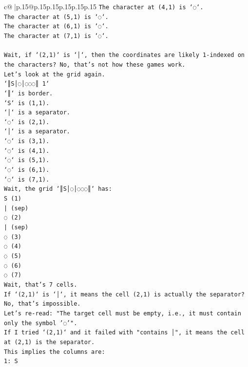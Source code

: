 \documentclass{article}
\begin{document}
{\begin{supertabular}{c@{$\;$}|p{.15\linewidth}@{}p{.15\linewidth}p{.15\linewidth}p{.15\linewidth}p{.15\linewidth}p{.15\linewidth}}
{{{\texttt{The character at (4,1) is `◌`.} \\
\texttt{The character at (5,1) is `◌`.} \\
\texttt{The character at (6,1) is `◌`.} \\
\texttt{The character at (7,1) is `◌`.} \\
\\ 
\texttt{Wait, if `(2,1)` is `│`, then the coordinates are likely 1{-}indexed on the characters? No, that's not how these games work.} \\
\texttt{Let's look at the grid again.} \\
\texttt{`║S│◌│◌◌◌║ 1`} \\
\texttt{`║` is border.} \\
\texttt{`S` is (1,1).} \\
\texttt{`│` is a separator.} \\
\texttt{`◌` is (2,1).} \\
\texttt{`│` is a separator.} \\
\texttt{`◌` is (3,1).} \\
\texttt{`◌` is (4,1).} \\
\texttt{`◌` is (5,1).} \\
\texttt{`◌` is (6,1).} \\
\texttt{`◌` is (7,1).} \\
\texttt{Wait, the grid `║S│◌│◌◌◌║` has:} \\
\texttt{S (1)} \\
\texttt{| (sep)} \\
\texttt{◌ (2)} \\
\texttt{| (sep)} \\
\texttt{◌ (3)} \\
\texttt{◌ (4)} \\
\texttt{◌ (5)} \\
\texttt{◌ (6)} \\
\texttt{◌ (7)} \\
\texttt{Wait, that's 7 cells.} \\
\texttt{If `(2,1)` is `│`, it means the cell (2,1) is actually the separator? No, that's impossible.} \\
\texttt{Let's re{-}read: "The target cell must be empty, i.e., it must contain only the symbol '◌'".} \\
\texttt{If I tried `(2,1)` and it failed with "contains │", it means the cell at (2,1) is the separator.} \\
\texttt{This implies the columns are:} \\
\texttt{1: S} \\
}}}
\end{supertabular}}
\end{document}
